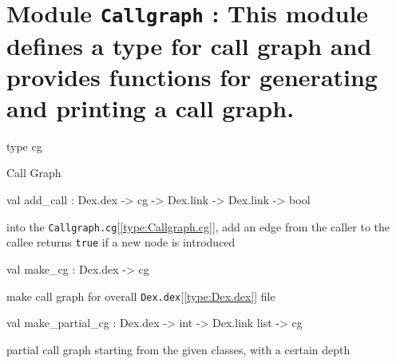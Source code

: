 \documentclass[11pt]{article}
\begin{document}
\section{Module {\tt{Callgraph}} : This module defines a type for call graph and provides functions for
 generating and printing a call graph.}
\label{module:Callgraph}




\ocamldocvspace{0.5cm}



\label{type:Callgraph.cg}\begin{ocamldoccode}
type cg 
\end{ocamldoccode}
\begin{ocamldocdescription}
Call Graph


\end{ocamldocdescription}




\label{val:Callgraph.add-underscorecall}\begin{ocamldoccode}
val add_call : Dex.dex -> cg -> Dex.link -> Dex.link -> bool
\end{ocamldoccode}
\begin{ocamldocdescription}
into the {\tt{Callgraph.cg}}[\ref{type:Callgraph.cg}], add an edge from the caller to the callee
 returns {\tt{true}} if a new node is introduced


\end{ocamldocdescription}




\label{val:Callgraph.make-underscorecg}\begin{ocamldoccode}
val make_cg : Dex.dex -> cg
\end{ocamldoccode}
\begin{ocamldocdescription}
make call graph for overall {\tt{Dex.dex}}[\ref{type:Dex.dex}] file


\end{ocamldocdescription}




\label{val:Callgraph.make-underscorepartial-underscorecg}\begin{ocamldoccode}
val make_partial_cg : Dex.dex -> int -> Dex.link list -> cg
\end{ocamldoccode}
\begin{ocamldocdescription}
partial call graph starting from the given classes, with a certain depth


\end{ocamldocdescription}
\end{document}

